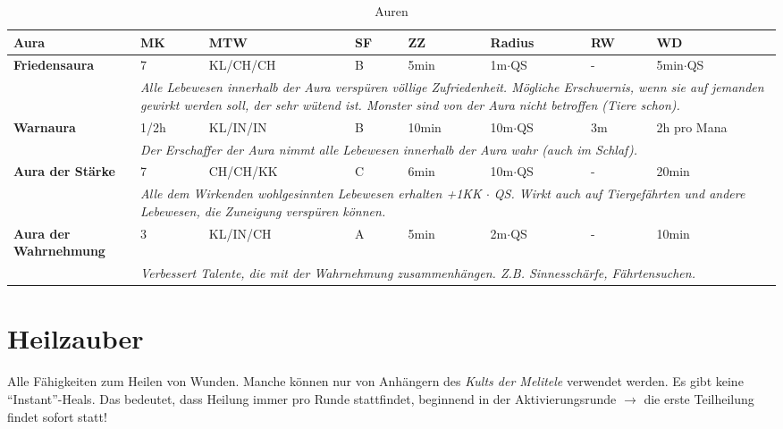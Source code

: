 \begin{table}[h]
\begin{center}
\begin{tabular}{|p{4cm}|p{0.8cm}|p{2.2cm}|p{0.8cm}|p{0.8cm}|p{2.2cm}|p{0.8cm}|p{2.5cm}|}
\hline
\textbf{Aura} & \textbf{MK} & \textbf{MTW} & \textbf{SF} & \textbf{ZZ} & \textbf{Radius} & \textbf{RW} & \textbf{WD} \\

\hline
\textbf{Friedensaura} & 7 & KL/CH/CH & B & 5min & 1m$\cdot$QS & - & 5min$\cdot$QS \\ \hline
\multicolumn{1}{r}{} & \multicolumn{7}{|p{13cm}|}{\textit{Alle Lebewesen innerhalb der Aura verspüren völlige Zufriedenheit. Mögliche Erschwernis, wenn sie auf jemanden gewirkt werden soll, der sehr wütend ist. Monster sind von der Aura nicht betroffen (Tiere schon).}} \\

\hline
\textbf{Warnaura} & 1/2h & KL/IN/IN & B & 10min & 10m$\cdot$QS & 3m & 2h pro Mana \\ \hline
\multicolumn{1}{r}{} & \multicolumn{7}{|p{13cm}|}{\textit{Der Erschaffer der Aura nimmt alle Lebewesen innerhalb der Aura wahr (auch im Schlaf).}} \\

\hline
\textbf{Aura der Stärke} & 7 & CH/CH/KK & C & 6min & 10m$\cdot$QS & - & 20min \\ \hline
\multicolumn{1}{r}{} & \multicolumn{7}{|p{13cm}|}{\textit{Alle dem Wirkenden wohlgesinnten Lebewesen erhalten +1KK $\cdot$ QS. Wirkt auch auf Tiergefährten und andere Lebewesen, die Zuneigung verspüren können.}} \\

\hline
\textbf{Aura der Wahrnehmung} & 3 & KL/IN/CH & A & 5min & 2m$\cdot$QS & - & 10min \\ \hline
\multicolumn{1}{r}{} & \multicolumn{7}{|p{13cm}|}{\textit{Verbessert Talente, die mit der Wahrnehmung zusammenhängen. Z.B. Sinnesschärfe, Fährtensuchen.}} \\

\cline{2-8}
\end{tabular}
\end{center}
\caption{Auren}
\label{tab:Auren}
\end{table}

\newpage
\section{Heilzauber}
Alle Fähigkeiten zum Heilen von Wunden. Manche können nur von Anhängern des \textit{Kults der Melitele} verwendet werden. Es gibt keine "`Instant"'-Heals. Das bedeutet, dass Heilung immer pro Runde stattfindet, beginnend in der Aktivierungsrunde $\rightarrow$ die erste Teilheilung findet sofort statt!

